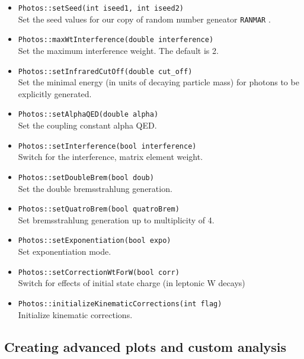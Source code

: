 \documentclass[]{Photos_interface_design}
\begin{document}
\begin{itemize}
  \item {\tt Photos::setSeed(int iseed1, int iseed2)} \\
        Set the  seed values for our copy of random number geneator {\tt RANMAR} \cite{RANMAR}.
  \item {\tt Photos::maxWtInterference(double interference)} \\
        Set the maximum interference weight. The default is 2.
  \item {\tt Photos::setInfraredCutOff(double cut\_off)} \\
        Set the minimal energy (in units of decaying particle mass)
        for photons to be explicitly generated.
  \item {\tt Photos::setAlphaQED(double alpha)} \\
        Set the coupling constant alpha QED.
  \item {\tt Photos::setInterference(bool interference)} \\
        Switch for the interference, matrix element weight.
  \item {\tt Photos::setDoubleBrem(bool doub)} \\
        Set the double bremsstrahlung generation.
  \item {\tt Photos::setQuatroBrem(bool quatroBrem)} \\
        Set bremsstrahlung generation up to multiplicity of 4.
  \item {\tt Photos::setExponentiation(bool expo)} \\
        Set exponentiation mode.
  \item {\tt Photos::setCorrectionWtForW(bool corr)} \\
        Switch for effects of initial state charge (in leptonic W decays)
  \item {\tt Photos::initializeKinematicCorrections(int flag)} \\
        Initialize kinematic corrections.
\end{itemize}

\subsection{Creating advanced plots and custom analysis}
\label{App:Plots}

\end{document}

